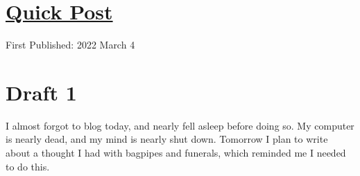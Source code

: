 \documentclass[12pt]{article}[titlepage]
\newcommand{\1}{\={a}}
\newcommand{\2}{\={e}}
\newcommand{\3}{\={\i}}
\newcommand{\4}{\=o}
\newcommand{\5}{\=u}
\newcommand{\6}{\={A}}
\renewcommand{\,}{\textsuperscript{,}}
\begin{document}
\doublespacing
\section{\href{quick-post.html}{Quick Post}}
First Published: 2022 March 4


\section{Draft 1}
I almost forgot to blog today, and nearly fell asleep before doing so.
My computer is nearly dead, and my mind is nearly shut down. 
Tomorrow I plan to write about a thought I had with bagpipes and funerals, which reminded me I needed to do this.
\end{document}
